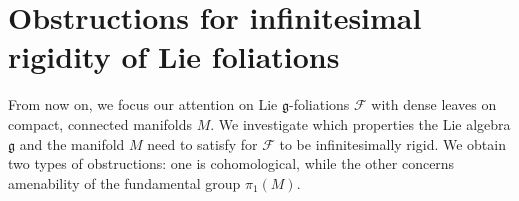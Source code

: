 \documentclass[11pt, letterpaper, oneside,reqno]{amsart}
\theoremstyle{plain}
\newtheorem{cor}[thm]{Corollary}
\theoremstyle{underline}
\theoremstyle{definition}
\newtheorem{defi}[thm]{Definition}
\theoremstyle{remark}
\begin{document}
	

	\color{black}
	\section{Obstructions for infinitesimal rigidity of Lie foliations}\label{sec:three}
	From now on, we focus our attention on Lie $\mathfrak{g}$-foliations $\mathcal{F}$ with dense leaves on compact, connected manifolds $M$. We investigate which properties the Lie algebra $\mathfrak{g}$ and the manifold $M$ need to satisfy for $\mathcal{F}$ to be infinitesimally rigid. We obtain two types of obstructions: one is cohomological, while the other concerns amenability of the fundamental group $\pi_{1}(M)$.
	
	
	
	
\end{document}
